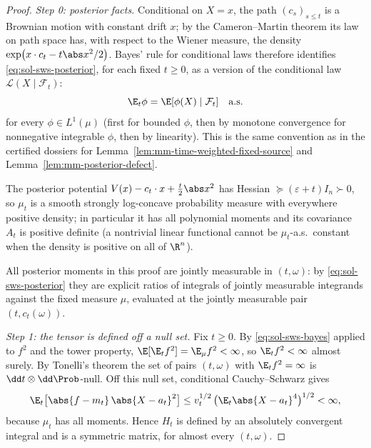 \documentclass[../main.tex]{subfiles}
\begin{document}
\begin{proof}
\noindent\emph{Step 0: posterior facts.}
Conditional on $X=x$, the path $(c_s)_{s\le t}$ is a Brownian motion with constant drift
$x$; by the Cameron--Martin theorem its law on path space has, with respect to the
Wiener measure, the density $\exp\bigl(x\cdot c_t-t\abs x^2/2\bigr)$.  Bayes' rule for
conditional laws therefore identifies \eqref{eq:sol-sws-posterior}, for each fixed
$t\ge0$, as a version of the conditional law $\mathcal L(X\mid\mathcal F_t)$:
\begin{equation}
  \E_t\phi=\E[\phi(X)\mid\mathcal F_t]\quad\text{a.s.}
  \label{eq:sol-sws-bayes}
\end{equation}
for every $\phi\in L^1(\mu)$ (first for bounded $\phi$, then by monotone convergence for
nonnegative integrable $\phi$, then by linearity).  This is the same convention as in the
certified dossiers for Lemma~\ref{lem:mm-time-weighted-fixed-source} and
Lemma~\ref{lem:mm-posterior-defect}.

The posterior potential $V(x)-c_t\cdot x+\tfrac t2\abs x^2$ has Hessian
$\succeq(\varepsilon+t)I_n\succ0$, so $\mu_t$ is a smooth strongly log-concave
probability measure with everywhere positive density; in particular it has all
polynomial moments and its covariance $A_t$ is positive definite (a nontrivial linear
functional cannot be $\mu_t$-a.s.\ constant when the density is positive on all of
$\R^n$).

All posterior moments in this proof are jointly measurable in $(t,\omega)$: by
\eqref{eq:sol-sws-posterior} they are explicit ratios of integrals of jointly measurable
integrands against the fixed measure $\mu$, evaluated at the jointly measurable pair
$(t,c_t(\omega))$.

\medskip
\noindent\emph{Step 1: the tensor is defined off a null set.}
Fix $t\ge0$.  By \eqref{eq:sol-sws-bayes} applied to $f^2$ and the tower property,
$\E[\E_tf^2]=\E_\mu f^2<\infty$, so $\E_tf^2<\infty$ almost surely.  By Tonelli's
theorem the set of pairs $(t,\omega)$ with $\E_tf^2=\infty$ is
$\dd t\otimes\dd\Prob$-null.  Off this null set, conditional Cauchy--Schwarz gives
\[
  \E_t\bigl[\abs{f-m_t}\,\abs{X-a_t}^2\bigr]
  \le v_t^{1/2}\,\bigl(\E_t\abs{X-a_t}^4\bigr)^{1/2}<\infty,
\]
because $\mu_t$ has all moments.  Hence $H_t$ is defined by an absolutely convergent
integral and is a symmetric matrix, for almost every $(t,\omega)$.


\end{proof}
\end{document}
